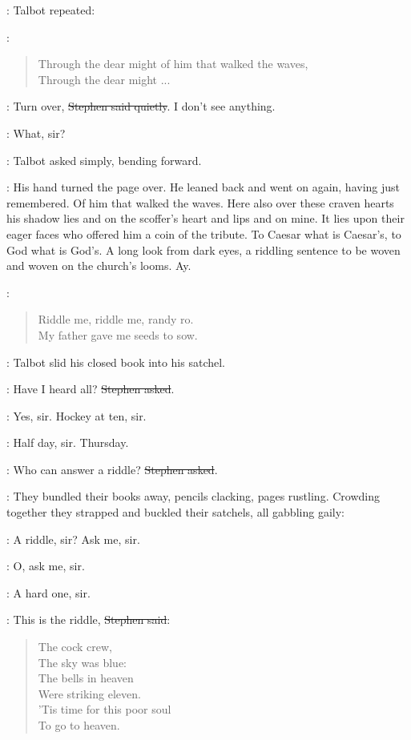 :
Talbot repeated:

\talbot:
\begin{verse}
    Through the dear might of him that walked the waves, \\
    Through the dear might ...
\end{verse}

\Stephen:
Turn over, \sout{Stephen said quietly}.
I don't see anything.

\talbot:
What, sir?

:
Talbot asked simply, bending forward.

:
His hand turned the page over.
He leaned back and went on again, having just remembered.
Of him that walked the waves.
Here also over these craven hearts his shadow lies
and on the scoffer's heart and lips and on mine.
It lies upon their eager faces who offered him a coin of the tribute.
To Caesar what is Caesar's, to God what is God's.
A long look from dark eyes,
a riddling sentence to be woven and woven on the church's looms.
Ay.

\StephenInt:
\begin{verse}
    Riddle me, riddle me, randy ro. \\
    My father gave me seeds to sow.
\end{verse}

:
Talbot slid his closed book into his satchel.

\Stephen:
Have I heard all?
\sout{Stephen asked}.

\talbot:
Yes, sir. Hockey at ten, sir.

\armstrong:
Half day, sir.
Thursday.

\Stephen:
Who can answer a riddle?
\sout{Stephen asked}.

:
They bundled their books away, pencils clacking, pages rustling.
Crowding together they strapped and buckled their satchels, all gabbling gaily:

\comyn:
A riddle, sir?
Ask me, sir.

\armstrong:
O, ask me, sir.

\cochrane:
A hard one, sir.

\Stephen:
This is the riddle,
\sout{Stephen said}:

\begin{verse}
    The cock crew, \\
    The sky was blue: \\
    The bells in heaven \\
    Were striking eleven. \\
    'Tis time for this poor soul \\
    To go to heaven.
\end{verse}

